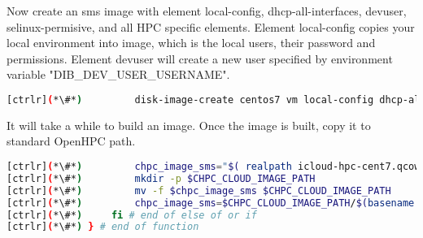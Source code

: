 	Now create an sms image with element local-config, dhcp-all-interfaces, devuser, selinux-permisive, and all HPC specific elements. Element local-config copies your local environment into image, which is the local users, their password and permissions. Element devuser will create a new user specified by environment variable "DIB\_DEV\_USER\_USERNAME". 


\begin{lstlisting}[language=bash,keywords={}]
[ctrlr](*\#*)         disk-image-create centos7 vm local-config dhcp-all-interfaces devuser selinux-permissive $DIB_HPC_ELEMENTS -o icloud-hpc-cent7-sms
\end{lstlisting} 

	It will take a while to build an image. Once the image is built, copy it to standard OpenHPC path.


\begin{lstlisting}[language=bash,keywords={}]
[ctrlr](*\#*)         chpc_image_sms="$( realpath icloud-hpc-cent7.qcow2)"
[ctrlr](*\#*)         mkdir -p $CHPC_CLOUD_IMAGE_PATH
[ctrlr](*\#*)         mv -f $chpc_image_sms $CHPC_CLOUD_IMAGE_PATH
[ctrlr](*\#*)         chpc_image_sms=$CHPC_CLOUD_IMAGE_PATH/$(basename $chpc_image_sms)
[ctrlr](*\#*)     fi # end of else of or if
[ctrlr](*\#*) } # end of function
\end{lstlisting} 
